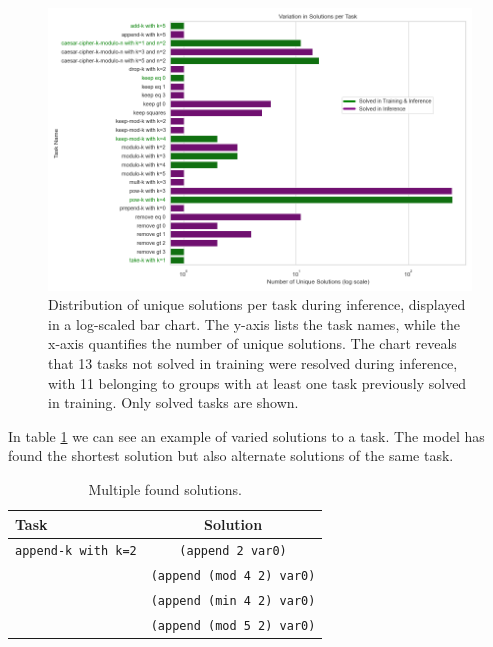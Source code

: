 \begin{figure}[ht]
    \centering
    \includegraphics[width=\textwidth]{../img/plot_solution_variations_inference.png}
    \caption{Distribution of unique solutions per task during inference, displayed in a log-scaled bar chart. The y-axis lists the task names, while the x-axis quantifies the number of unique solutions. The chart reveals that 13 tasks not solved in training were resolved during inference, with 11 belonging to groups with at least one task previously solved in training. Only solved tasks are shown.}
    \label{fig:solution_variations_inference}
    \end{figure}

In table \ref{tab:multiple_solutions} we can see an example of varied solutions to a task. The model has found the shortest solution but also alternate solutions of the same task.

\begin{table}[H]
    \centering
    \begin{tabular}{|l|c|}
        \hline
        \textbf{Task} & \textbf{Solution}  \\\hline
        \texttt{append-k with k=2} & \texttt{(append 2 var0)} \\
        \texttt{} & \texttt{(append (mod 4 2) var0)} \\
        \texttt{} & \texttt{(append (min 4 2) var0)} \\
        \texttt{} & \texttt{(append (mod 5 2) var0)} \\
        \hline
    \end{tabular}
    \caption{Multiple found solutions.}
    \label{tab:multiple_solutions}
\end{table}

